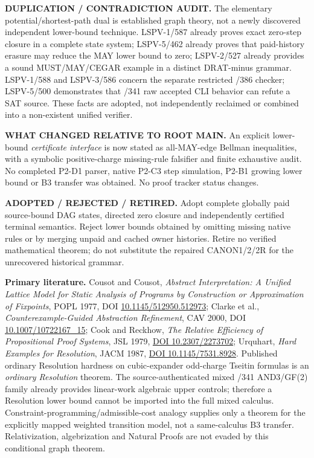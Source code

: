 \documentclass[11pt]{article}
\begin{document}
\noindent\textbf{DUPLICATION / CONTRADICTION AUDIT.}
The elementary potential/shortest-path dual is established graph theory,
not a newly discovered independent lower-bound technique.
LSPV-1/587 already proves exact zero-step closure in a complete
state system; LSPV-5/462 already proves that paid-history erasure
may reduce the MAY lower bound to zero; LSPV-2/527 already provides
a sound MUST/MAY/CEGAR example in a distinct DRAT-minus grammar.
LSPV-1/588 and LSPV-3/586 concern the separate restricted /386
checker; LSPV-5/500 demonstrates that /341 raw accepted CLI behavior
can refute a SAT source. These facts are adopted, not independently
reclaimed or combined into a non-existent unified verifier.

\noindent\textbf{WHAT CHANGED RELATIVE TO ROOT MAIN.}
An explicit lower-bound \emph{certificate interface} is now stated
as all-MAY-edge Bellman inequalities, with a symbolic
positive-charge missing-rule falsifier and finite exhaustive audit.
No completed P2-D1 parser, native P2-C3 step simulation, P2-B1 growing
lower bound or B3 transfer was obtained. No proof tracker status changes.

\noindent\textbf{ADOPTED / REJECTED / RETIRED.}
Adopt complete globally paid source-bound DAG states, directed zero
closure and independently certified terminal semantics. Reject
lower bounds obtained by omitting missing native rules or by merging
unpaid and cached owner histories. Retire no verified mathematical
theorem; do not substitute the repaired CANON1/2/2R for the
unrecovered historical grammar.

\noindent\textbf{Primary literature.}
Cousot and Cousot, \emph{Abstract Interpretation: A Unified Lattice
Model for Static Analysis of Programs by Construction or Approximation
of Fixpoints}, POPL 1977, DOI
\href{https://doi.org/10.1145/512950.512973}{10.1145/512950.512973};
Clarke et al., \emph{Counterexample-Guided Abstraction Refinement},
CAV 2000, DOI
\href{https://doi.org/10.1007/10722167_15}{10.1007/10722167\_15};
Cook and Reckhow, \emph{The Relative Efficiency of Propositional
Proof Systems}, JSL 1979,
\href{https://doi.org/10.2307/2273702}{DOI 10.2307/2273702};
Urquhart, \emph{Hard Examples for Resolution}, JACM 1987,
\href{https://doi.org/10.1145/7531.8928}{DOI 10.1145/7531.8928}.
Published ordinary Resolution hardness on cubic-expander odd-charge
Tseitin formulas is an \emph{ordinary Resolution} theorem.
The source-authenticated mixed /341 AND3/GF(2) family already
provides linear-work algebraic upper controls; therefore a
Resolution lower bound cannot be imported into the full
mixed calculus. Constraint-programming/admissible-cost analogy
supplies only a theorem for the explicitly mapped weighted
transition model, not a same-calculus B3 transfer.
Relativization, algebrization and Natural Proofs are not evaded
by this conditional graph theorem.
\end{document}
